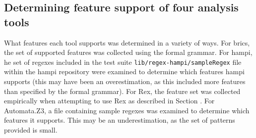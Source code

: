 \subsection*{Determining feature support of four analysis tools}
\label{sec:determiningToolFeatures}
What features each tool supports was determined in a variety of ways.  For brics, the set of supported features was collected using the formal grammar.  For hampi, he set of regexes included in the test suite {\tt lib/regex-hampi/sampleRegex} file within the hampi repository were examined to determine which features hampi supports (this may have been an overestimation, as this included more features than specified by the formal grammar).  For Rex, the feature set was collected empirically when attempting to use Rex as described in Section  .  For Automata.Z3, a file containing sample regexes was examined to determine which features it supports.  This may be an underestimation, as the set of patterns provided is small.





